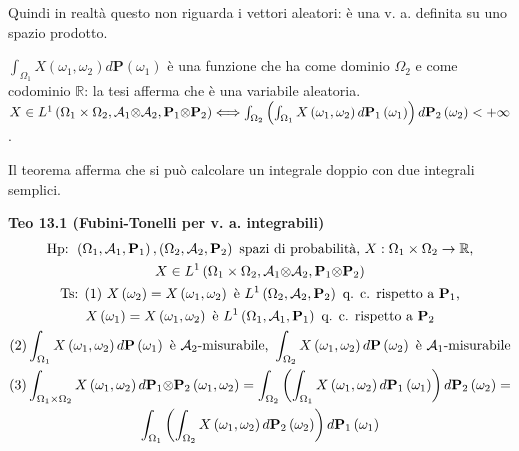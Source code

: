 \documentclass{article}
\begin{document}
Quindi in realt\`{a} questo non riguarda i vettori aleatori: \`{e} una v. a.
definita su uno spazio prodotto.

$\int_{\Omega _{1}}X\left( \omega _{1},\omega _{2}\right) d\mathbf{P}\left(
\omega _{1}\right) $ \`{e} una funzione che ha come dominio $\Omega _{2}$ e
come codominio $%
\mathbb{R}
$: la tesi afferma che \`{e} una variabile aleatoria. $X\in L^{1}\left(
\Omega _{1}\times \Omega _{2},\mathcal{A}_{1}\mathcal{\otimes A}_{2},\mathbf{%
P}_{1}\mathcal{\otimes }\mathbf{P}_{2}\right) \Longleftrightarrow
\int_{\Omega _{2}}\left( \int_{\Omega _{1}}X\left( \omega _{1},\omega
_{2}\right) d\mathbf{P}_{1}\left( \omega _{1}\right) \right) d\mathbf{P}%
_{2}\left( \omega _{2}\right) <+\infty $.

Il teorema afferma che si pu\`{o} calcolare un integrale doppio con due
integrali semplici.

\textbf{Teo 13.1 (Fubini-Tonelli per v. a. integrabili) }%
\begin{gather*}
\text{Hp: }\left( \Omega _{1},\mathcal{A}_{1},\mathbf{P}_{1}\right) ,\left(
\Omega _{2},\mathcal{A}_{2},\mathbf{P}_{2}\right) \text{ spazi di probabilit%
\`{a}, }X:\Omega _{1}\times \Omega _{2}\rightarrow 
\mathbb{R}
\text{,} \\
X\in L^{1}\left( \Omega _{1}\times \Omega _{2},\mathcal{A}_{1}\mathcal{%
\otimes A}_{2},\mathbf{P}_{1}\mathcal{\otimes }\mathbf{P}_{2}\right) \\
\text{Ts: (1) }X\left( \omega _{2}\right) =X\left( \omega _{1},\omega
_{2}\right) \text{ \`{e} }L^{1}\left( \Omega _{2},\mathcal{A}_{2},\mathbf{P}%
_{2}\right) \text{ q. c. rispetto a }\mathbf{P}_{1}\text{,} \\
X\left( \omega _{1}\right) =X\left( \omega _{1},\omega _{2}\right) \text{ 
\`{e} }L^{1}\left( \Omega _{1},\mathcal{A}_{1},\mathbf{P}_{1}\right) \text{
q. c. rispetto a }\mathbf{P}_{2} \\
\text{(2)}\int_{\Omega _{1}}X\left( \omega _{1},\omega _{2}\right) d\mathbf{P%
}\left( \omega _{1}\right) \text{ \`{e} }\mathcal{A}_{2}\text{-misurabile, }%
\int_{\Omega _{2}}X\left( \omega _{1},\omega _{2}\right) d\mathbf{P}\left(
\omega _{2}\right) \text{ \`{e} }\mathcal{A}_{1}\text{-misurabile} \\
\text{(3)}\int_{\Omega _{1}\times \Omega _{2}}X\left( \omega _{1},\omega
_{2}\right) d\mathbf{P}_{1}\mathcal{\otimes }\mathbf{P}_{2}\left( \omega
_{1},\omega _{2}\right) =\int_{\Omega _{2}}\left( \int_{\Omega _{1}}X\left(
\omega _{1},\omega _{2}\right) d\mathbf{P}_{1}\left( \omega _{1}\right)
\right) d\mathbf{P}_{2}\left( \omega _{2}\right) = \\
\int_{\Omega _{1}}\left( \int_{\Omega _{2}}X\left( \omega _{1},\omega
_{2}\right) d\mathbf{P}_{2}\left( \omega _{2}\right) \right) d\mathbf{P}%
_{1}\left( \omega _{1}\right)
\end{gather*}
\end{document}
